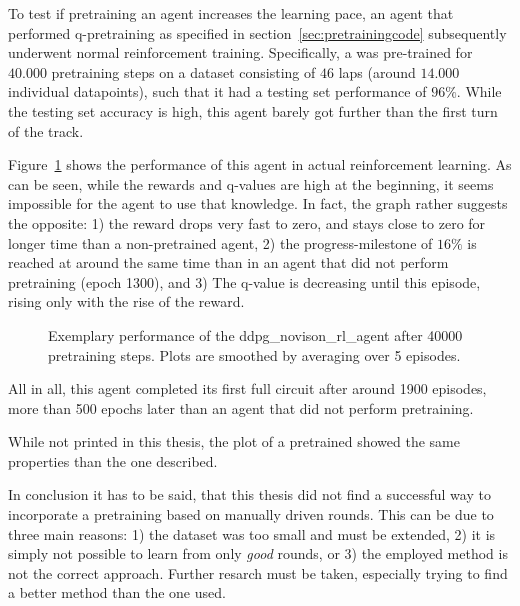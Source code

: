 To test if pretraining an agent increases the learning pace, an agent that performed q-pretraining as specified in section~\ref{sec:pretrainingcode} subsequently underwent normal reinforcement training. Specifically, a  was pre-trained for $40.000$ pretraining steps on a dataset consisting of $46$ laps (around $14.000$ individual datapoints), such that it had a testing set performance of $96\%$. While the testing set accuracy is high, this agent barely got further than the first turn of the track.

Figure~\ref{fig:ddpg_incorpPre} shows the performance of this agent in actual reinforcement learning. As can be seen, while the rewards and q-values are high at the beginning, it seems impossible for the agent to use that knowledge. In fact, the graph rather suggests the opposite: 1) the reward drops very fast to zero, and stays close to zero for longer time than a non-pretrained agent, 2) the progress-milestone of $16\%$ is reached at around the same time than in an agent that did not perform pretraining (epoch 1300), and 3) The q-value is decreasing until this episode, rising only with the rise of the reward.

\begin{figure}[h]
	{%
		\setlength{\fboxsep}{0pt}%
		\setlength{\fboxrule}{1pt}%
	}%
	\centering
	\caption[Exemplary performance of the ddpg\_novison\_rl\_agent after 40000 pretrain steps]{Exemplary performance of the ddpg\_novison\_rl\_agent after 40000 pretraining steps. Plots are smoothed by averaging over 5 episodes.}
	\label{fig:ddpg_incorpPre}
\end{figure}

All in all, this agent completed its first full circuit after around 1900 episodes, more than 500 epochs later than an agent that did not perform pretraining. 

While not printed in this thesis, the plot of a pretrained  showed the same properties than the one described.

In conclusion it has to be said, that this thesis did not find a successful way to incorporate a pretraining based on manually driven rounds. This can be due to three main reasons: 1) the dataset was too small and must be extended, 2) it is simply not possible to learn from only \textit{good} rounds, or 3) the employed method is not the correct approach. Further resarch must be taken, especially trying to find a better method than the one used.

